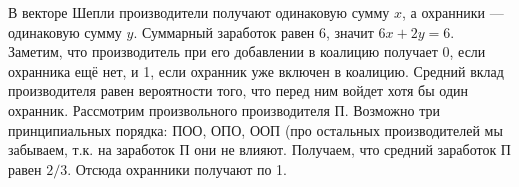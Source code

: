 \begin{solution}{7.3}

\end{solution}
\begin{solution}{7.4}

\end{solution}
\begin{solution}{7.5}

\end{solution}
\begin{solution}{7.6}

\end{solution}
\begin{solution}{7.7}
В векторе Шепли производители получают одинаковую сумму $x$, а охранники --- одинаковую сумму $y$. Суммарный заработок равен 6, значит $6x+2y=6$. Заметим, что производитель при его добавлении в коалицию получает 0, если охранника ещё нет, и 1, если охранник уже включен в коалицию. Средний вклад производителя равен вероятности того, что перед ним войдет хотя бы один охранник. Рассмотрим произвольного производителя П. Возможно три принципиальных порядка: ПОО, ОПО, ООП (про остальных производителей мы забываем, т.к. на заработок П они не влияют. Получаем, что средний заработок П равен $2/3$. Отсюда охранники получают по 1.


\end{solution}
\begin{solution}{7.8}

\end{solution}
\begin{solution}{7.9}

\end{solution}
\begin{solution}{7.10}

\end{solution}
\begin{solution}{7.11}

\end{solution}
\begin{solution}{7.12}

\end{solution}
\begin{solution}{7.13}

\end{solution}
\begin{solution}{7.14}

\end{solution}
\begin{solution}{7.15}

\end{solution}
